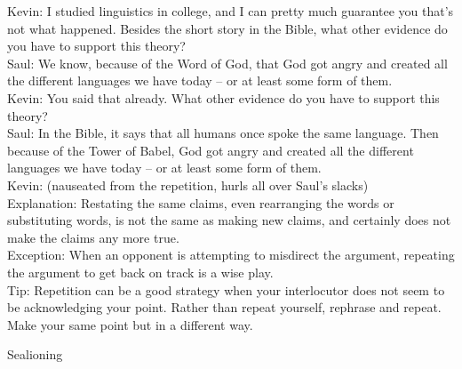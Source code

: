 \documentclass[a4paper,12pt,single,pdftex]{scrartcl}
\begin{document}
{    
      Kevin: I studied linguistics in college, and I can pretty much guarantee you that’s not what happened.  Besides the short story in the Bible, what other evidence do you have to support this theory?
    \\

    
      Saul: We know, because of the Word of God, that God got angry and created all the different languages we have today -- or at least some form of them.
    \\

    
      Kevin: You said that already.  What other evidence do you have to support this theory?
    \\

    
      Saul: In the Bible, it says that all humans once spoke the same language.  Then because of the Tower of Babel, God got angry and created all the different languages we have today -- or at least some form of them.
    \\

    
      Kevin: (nauseated from the repetition, hurls all over Saul’s slacks)
    \\

    
      Explanation: Restating the same claims, even rearranging the words or substituting words, is not the same as making new claims, and certainly does not make the claims any more true.
    \\

    
      Exception: When an opponent is attempting to misdirect the argument, repeating the argument to get back on track is a wise play.
    \\

    
      Tip: Repetition can be a good strategy when your interlocutor does not seem to be acknowledging your point. Rather than repeat yourself, rephrase and repeat. Make your same point but in a different way.
    \\

  }


Sealioning
\end{document}
